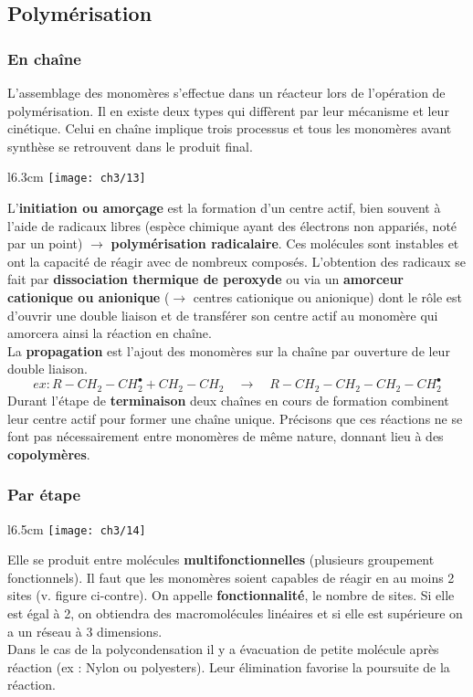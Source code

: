 	\subsection{Polymérisation}
		\subsubsection{En chaîne}
			L'assemblage des monomères s'effectue dans un réacteur lors de l'opération de polymérisation. Il en existe deux types qui diffèrent par leur mécanisme et leur cinétique. Celui en chaîne implique trois processus et tous les monomères avant synthèse se retrouvent dans le produit final. \\
			\begin{wrapfigure}[9]{l}{6.3cm}
			\vspace{-5mm}
			\texttt{[image: ch3/13]}
			\end{wrapfigure}	
			L'\textbf{initiation ou amorçage} est la formation d'un centre actif, bien souvent à l'aide de radicaux libres (espèce chimique ayant des électrons non appariés, noté par un point) $\rightarrow$ \textbf{polymérisation radicalaire}. Ces molécules sont instables et ont la capacité de réagir avec de nombreux composés. L'obtention des radicaux se fait par \textbf{dissociation thermique de peroxyde} ou via un \textbf{amorceur cationique ou anionique} ($\rightarrow$ centres cationique ou anionique) dont le rôle est d'ouvrir une double liaison et de transférer son centre actif au monomère qui amorcera ainsi la réaction en chaîne.  \\
			La \textbf{propagation} est l'ajout des monomères sur la chaîne par ouverture de leur double liaison.
			\begin{equation}
				ex : R - CH_2 - CH_2^\bullet + CH_2 - CH_2 \quad \rightarrow \quad R - CH_2 - CH_2- CH_2 - CH_2^\bullet
			\end{equation}
			Durant l'étape de \textbf{terminaison} deux chaînes en cours de formation combinent leur centre actif pour former une chaîne unique. Précisons que ces réactions ne se font pas nécessairement entre monomères de même nature, donnant lieu à des \textbf{copolymères}. 
			
	\subsubsection{Par étape}
		\begin{wrapfigure}[5]{l}{6.5cm}
		\vspace{-5mm}
		\texttt{[image: ch3/14]}
		\end{wrapfigure}	
		Elle se produit entre molécules \textbf{multifonctionnelles} (plusieurs groupement fonctionnels). Il faut que les monomères soient capables de réagir en au moins 2 sites (v. figure ci-contre).  On appelle \textbf{fonctionnalité}, le nombre de sites. Si elle est égal à 2, on obtiendra des macromolécules linéaires et si elle est supérieure on a un réseau à 3 dimensions. \\
		Dans le cas de la polycondensation il y a évacuation de petite molécule après réaction (ex : Nylon ou polyesters). Leur élimination favorise la poursuite de la réaction. 
		
